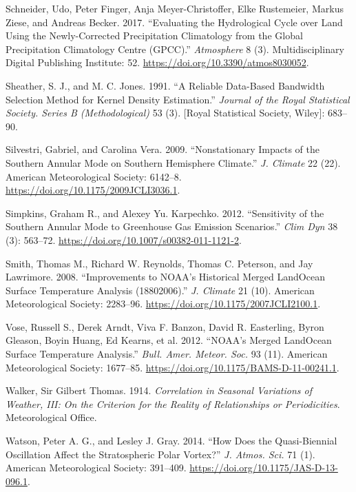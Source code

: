\documentclass[smallextended]{svjour3}       %
\begin{document}
\leavevmode\hypertarget{ref-schneider2017}{}%
Schneider, Udo, Peter Finger, Anja Meyer-Christoffer, Elke Rustemeier, Markus Ziese, and Andreas Becker. 2017. ``Evaluating the Hydrological Cycle over Land Using the Newly-Corrected Precipitation Climatology from the Global Precipitation Climatology Centre (GPCC).'' \emph{Atmosphere} 8 (3). Multidisciplinary Digital Publishing Institute: 52. \url{https://doi.org/10.3390/atmos8030052}.

\leavevmode\hypertarget{ref-sheather1991}{}%
Sheather, S. J., and M. C. Jones. 1991. ``A Reliable Data-Based Bandwidth Selection Method for Kernel Density Estimation.'' \emph{Journal of the Royal Statistical Society. Series B (Methodological)} 53 (3). {[}Royal Statistical Society, Wiley{]}: 683--90.

\leavevmode\hypertarget{ref-silvestri2009}{}%
Silvestri, Gabriel, and Carolina Vera. 2009. ``Nonstationary Impacts of the Southern Annular Mode on Southern Hemisphere Climate.'' \emph{J. Climate} 22 (22). American Meteorological Society: 6142--8. \url{https://doi.org/10.1175/2009JCLI3036.1}.

\leavevmode\hypertarget{ref-simpkins2012}{}%
Simpkins, Graham R., and Alexey Yu. Karpechko. 2012. ``Sensitivity of the Southern Annular Mode to Greenhouse Gas Emission Scenarios.'' \emph{Clim Dyn} 38 (3): 563--72. \url{https://doi.org/10.1007/s00382-011-1121-2}.

\leavevmode\hypertarget{ref-smith2008}{}%
Smith, Thomas M., Richard W. Reynolds, Thomas C. Peterson, and Jay Lawrimore. 2008. ``Improvements to NOAA's Historical Merged LandOcean Surface Temperature Analysis (18802006).'' \emph{J. Climate} 21 (10). American Meteorological Society: 2283--96. \url{https://doi.org/10.1175/2007JCLI2100.1}.

\leavevmode\hypertarget{ref-vose2012}{}%
Vose, Russell S., Derek Arndt, Viva F. Banzon, David R. Easterling, Byron Gleason, Boyin Huang, Ed Kearns, et al. 2012. ``NOAA's Merged LandOcean Surface Temperature Analysis.'' \emph{Bull. Amer. Meteor. Soc.} 93 (11). American Meteorological Society: 1677--85. \url{https://doi.org/10.1175/BAMS-D-11-00241.1}.

\leavevmode\hypertarget{ref-walker1914}{}%
Walker, Sir Gilbert Thomas. 1914. \emph{Correlation in Seasonal Variations of Weather, III: On the Criterion for the Reality of Relationships or Periodicities}. Meteorological Office.

\leavevmode\hypertarget{ref-watson2014}{}%
Watson, Peter A. G., and Lesley J. Gray. 2014. ``How Does the Quasi-Biennial Oscillation Affect the Stratospheric Polar Vortex?'' \emph{J. Atmos. Sci.} 71 (1). American Meteorological Society: 391--409. \url{https://doi.org/10.1175/JAS-D-13-096.1}.
\end{document}
